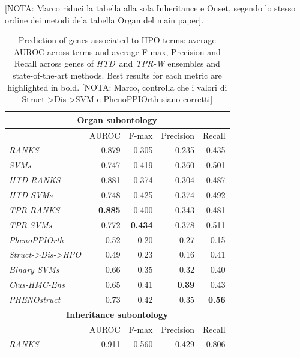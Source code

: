 \documentclass{bioinfo}
\newcommand{\htd}{{\em HTD}}
\begin{document}
[NOTA: Marco riduci la tabella alla sola Inheritance e Onset, segendo lo stesso ordine dei metodi dela tabella Organ del main paper].
\begin{table}[!h]
\caption{Prediction of genes associated to HPO terms: average AUROC across terms and average F-max, Precision and Recall across genes of \htd~and {\em TPR-W} ensembles and state-of-the-art methods. Best results for each metric are highlighted in bold. [NOTA: Marco, controlla che i valori di Struct->Dis->SVM e PhenoPPIOrth siano corretti]}
\label{tab:best-results}  
\begin{center}
\begin{tabular}{|l|r|r|r|r|} 
\hline  
  \multicolumn{5}{|c|}{{\bf Organ subontology} }\\ \hline
     &  AUROC & F-max  &  Precision  & Recall \\ \hline
\textsl{RANKS} 		& 0.879 & 0.305 & 0.235 & 0.435 \\ \hline
\textsl{SVMs} 		& 0.747 & 0.419 & 0.360 & 0.501 \\ \hline
\textsl{HTD-RANKS}  	& 0.881 & 0.374 & 0.304 & 0.487 \\  \hline
\textsl{HTD-SVMs}	& 0.748 & 0.425 & 0.374 & 0.492	\\  \hline
\textsl{TPR-RANKS}  	& {\bf 0.885} & 0.400 & 0.343 & 0.481 \\  \hline
\textsl{TPR-SVMs}   	& 0.772 & {\bf 0.434} & 0.378 & 0.511	\\  \hline
\textsl{PhenoPPIOrth} & 0.52 & 0.20 & 0.27 & 0.15  \\ \hline
\textsl{Struct->Dis->HPO} & 0.49 & 0.23 & 0.16 & 0.41  \\ \hline
\textsl{Binary SVMs}  & 0.66 & 0.35 & 0.32 & 0.40  \\ \hline 
\textsl{Clus-HMC-Ens}   & 0.65 & 0.41 & \bf{0.39} & 0.43		\\  \hline
\textsl{PHENOstruct}    & 0.73 & 0.42 & 0.35 & \bf{0.56}		\\  \hline
\hline   
  \multicolumn{5}{|c|}{{\bf Inheritance subontology}  }\\ \hline
    &  AUROC & F-max  &  Precision  & Recall \\ \hline
\textsl{RANKS} 		& 0.911 & 0.560 & 0.429 & 0.806 \\ \hline

\end{tabular}
\end{center}
\end{table}
\end{document}
